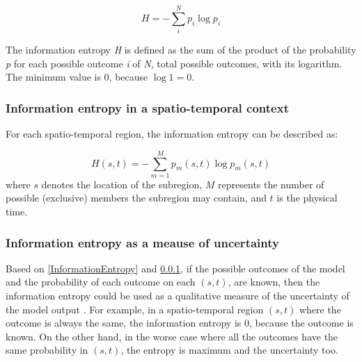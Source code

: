 \begin{equation}
H=-\sum_{i}^N p_{i}\log p_{i}
\end{equation}

The information entropy \textit{H} is defined as the sum of the product of the probability \textit{p} for each possible outcome \textit{i} of \textit{N}, total possible outcomes, with its logarithm. The minimum value is 0, because $\log 1=0$. 

\subsubsection{Information entropy in a spatio-temporal context}
\label{InformationEntropySpatioTemporal}
For each spatio-temporal region, the information entropy can be described as: 

\begin{equation}\label{eq: spatio-temporal Entropy}
H(s,t)=-\sum_{m=1}^M p_{m}(s,t)\log p_{m}(s,t)
\end{equation}
where $s$ denotes the location of the subregion, $M$ represents the number of possible (exclusive) members the subregion may contain, and $t$ is the physical time.

\subsubsection{Information entropy as a meause of uncertainty}\label{subsub:informationentropytomeasuretheuncertainty}
Based on \ref{InformationEntropy} and \ref{InformationEntropySpatioTemporal}, if the possible outcomes of the model and the probability of each outcome on each $(s,t)$, are known, then the information entropy could be used as a qualitative measure of the uncertainty of the model output \cite{Wellmann2012}. For example, in a spatio-temporal region $(s,t)$ where the outcome is always the same, the information entropy is 0, because the outcome is known. On the other hand, in the worse case where all the outcomes have the same probability in $(s,t)$, the entropy is maximum and the uncertainty too.


